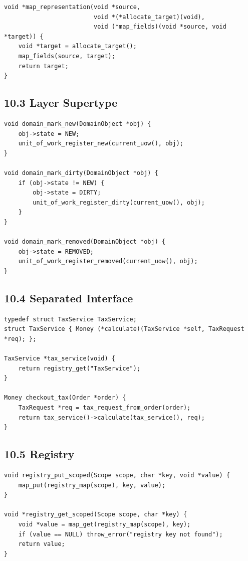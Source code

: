 \documentclass[11pt]{article}
\begin{document}
\begin{verbatim}
void *map_representation(void *source,
                         void *(*allocate_target)(void),
                         void (*map_fields)(void *source, void *target)) {
    void *target = allocate_target();
    map_fields(source, target);
    return target;
}
\end{verbatim}

\subsection{10.3 Layer Supertype}\label{layer-supertype}

\begin{verbatim}
void domain_mark_new(DomainObject *obj) {
    obj->state = NEW;
    unit_of_work_register_new(current_uow(), obj);
}

void domain_mark_dirty(DomainObject *obj) {
    if (obj->state != NEW) {
        obj->state = DIRTY;
        unit_of_work_register_dirty(current_uow(), obj);
    }
}

void domain_mark_removed(DomainObject *obj) {
    obj->state = REMOVED;
    unit_of_work_register_removed(current_uow(), obj);
}
\end{verbatim}

\subsection{10.4 Separated Interface}\label{separated-interface}

\begin{verbatim}
typedef struct TaxService TaxService;
struct TaxService { Money (*calculate)(TaxService *self, TaxRequest *req); };

TaxService *tax_service(void) {
    return registry_get("TaxService");
}

Money checkout_tax(Order *order) {
    TaxRequest *req = tax_request_from_order(order);
    return tax_service()->calculate(tax_service(), req);
}
\end{verbatim}

\subsection{10.5 Registry}\label{registry}

\begin{verbatim}
void registry_put_scoped(Scope scope, char *key, void *value) {
    map_put(registry_map(scope), key, value);
}

void *registry_get_scoped(Scope scope, char *key) {
    void *value = map_get(registry_map(scope), key);
    if (value == NULL) throw_error("registry key not found");
    return value;
}
\end{verbatim}
\end{document}
